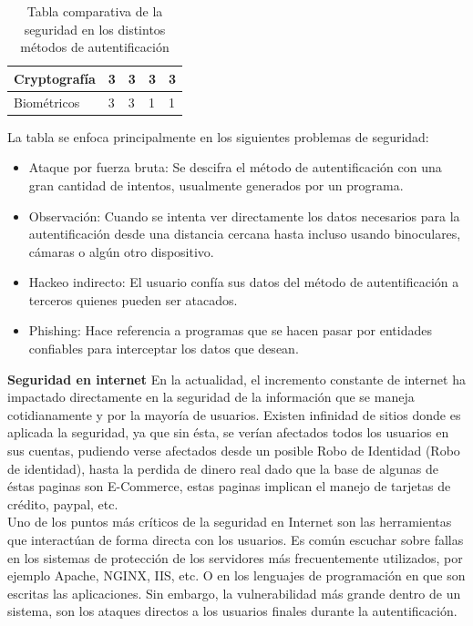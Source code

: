 \documentclass[12pt, a4paper, titlepage]{report}
\begin{document}
\begin{table}[H]
{\begin{tabular}{l|l|l|l|l|}
					\multicolumn{1}{|l|}{Cryptografía}                                                     & 3                                                                 & 3           & 3                                                          & 3        \\ \hline
					\multicolumn{1}{|l|}{Biométricos}                                                      & 3                                                                 & 3           & 1                                                          & 1        \\ \hline
				\end{tabular}
			}
			\caption{Tabla comparativa de la seguridad en los distintos métodos de autentificaci\'on}
		\end{table}
		La tabla se enfoca principalmente en los siguientes problemas de seguridad: 
		
		\begin{itemize}
			\item Ataque por fuerza bruta: Se descifra el método de autentificaci\'on con una gran cantidad de intentos, usualmente generados por un programa.
			\item Observación: Cuando se intenta ver directamente los datos necesarios para la autentificaci\'on desde una distancia cercana hasta incluso usando binoculares, cámaras o algún otro dispositivo.
			\item Hackeo indirecto: El usuario confía sus datos del método de autentificaci\'on a terceros quienes pueden ser atacados. 
			\item Phishing: Hace referencia a programas que se hacen pasar por entidades confiables para interceptar los datos que desean.
		\end{itemize}
		
	    \textbf{Seguridad en internet}
	    En la actualidad, el incremento constante de internet ha impactado directamente en la seguridad de la información que se maneja cotidianamente y por la mayoría de usuarios. Existen infinidad de sitios donde es aplicada la seguridad, ya que sin ésta, se verían afectados todos los usuarios en  sus cuentas, pudiendo verse afectados desde un posible \Gls{Robo de Identidad} (Robo de identidad), hasta la perdida de dinero real dado que la base de algunas de éstas paginas son E-Commerce, estas paginas implican el manejo de tarjetas de crédito, paypal, etc.\\
		
		Uno de los puntos más críticos de la seguridad en Internet son las herramientas que interactúan de forma directa con los usuarios. Es común escuchar sobre fallas en los sistemas de protección de los servidores más frecuentemente utilizados, por ejemplo Apache, NGINX, IIS, etc. O en los lenguajes de programación en que son escritas las aplicaciones. \cite{refSeguridadWeb} Sin embargo, la vulnerabilidad más grande dentro de un sistema, son los ataques directos a los usuarios finales durante la autentificación.\\
	    
\end{document}
